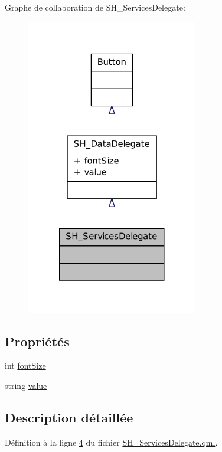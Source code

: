 Graphe de collaboration de S\-H\-\_\-\-Services\-Delegate\-:
\nopagebreak
\begin{figure}[H]
\begin{center}
\leavevmode
\includegraphics[width=212pt]{classSH__ServicesDelegate__coll__graph}
\end{center}
\end{figure}
\subsection*{Propriétés}
\begin{DoxyCompactItemize}
\item 
int \hyperlink{classSH__DataDelegate_afbb41ad9b513c7f27e7b5ad90d82e95b}{font\-Size}
\item 
string \hyperlink{classSH__DataDelegate_acb9da3c73493c88865e08d9575f26482}{value}
\end{DoxyCompactItemize}


\subsection{Description détaillée}


Définition à la ligne \hyperlink{SH__ServicesDelegate_8qml_source_l00004}{4} du fichier \hyperlink{SH__ServicesDelegate_8qml_source}{S\-H\-\_\-\-Services\-Delegate.\-qml}.



